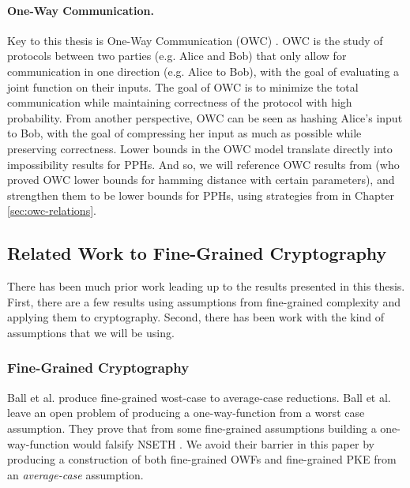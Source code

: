 \paragraph{One-Way Communication.}
Key to this thesis is One-Way Communication (OWC) \cite{Yao79,KNR95}. OWC is the study of protocols between two parties (e.g. Alice and Bob) that only allow for communication in one direction (e.g. Alice to Bob), with the goal of evaluating a joint function on their inputs. The goal of OWC is to minimize the total communication while maintaining correctness of the protocol with high probability. From another perspective, OWC can be seen as hashing Alice's input to Bob, with the goal of compressing her input as much as possible while preserving correctness. Lower bounds in the OWC model translate directly into impossibility results for PPHs. And so, we will reference OWC results from \cite{Woodruff04,Woodruff07,JKS08} (who proved OWC lower bounds for hamming distance with certain parameters), and strengthen them to be lower bounds for PPHs, using strategies from \cite{JKS08} in Chapter \ref{sec:owc-relations}.

\subsection{Related Work to Fine-Grained Cryptography}
There has been much prior work leading up to the results presented in this thesis. First, there are a few results using assumptions from fine-grained complexity and applying them to cryptography. Second, there has been work with the kind of assumptions that we will be using.


\subsubsection{Fine-Grained Cryptography}
Ball et al. \cite{avgCaseFineGrained,eprintAvgCaseFG} produce fine-grained wost-case to average-case reductions. Ball et al. leave an open problem of producing a one-way-function from a worst case assumption. They prove that from some fine-grained assumptions building a one-way-function would falsify NSETH \cite{CarmosinoGIMPS16}\cite{avgCaseFineGrained}.
We avoid their barrier in this paper by producing a construction of both fine-grained OWFs and fine-grained PKE from an \emph{average-case} assumption.



